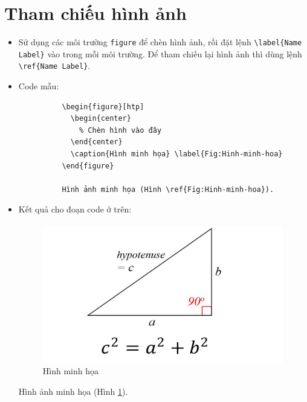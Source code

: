 \documentclass[12pt,a4paper]{article}
\begin{document}
  \section{Tham chiếu hình ảnh}
    \begin{itemize}
      \item Sử dụng các môi trường \verb|figure| để chèn hình ảnh, rồi đặt lệnh \verb|\label{Name Label}| vào trong mỗi môi trường. Để tham chiếu lại hình ảnh thì dùng lệnh \verb|\ref{Name Label}|.
      \item Code mẫu:
        \begin{verbatim}
          \begin{figure}[htp]
            \begin{center}
              % Chèn hình vào đây
            \end{center}
            \caption{Hình minh họa} \label{Fig:Hinh-minh-hoa}
          \end{figure}
    
          Hình ảnh minh họa (Hình \ref{Fig:Hinh-minh-hoa}).
        \end{verbatim}
      \item Kết quả cho đoạn code ở trên:
        
      \begin{figure}[!htp]
        \begin{center}
          \includegraphics[scale=0.5]{images/pytago}
        \end{center}
        \caption{Hình minh họa} \label{Fig:Hinh-minh-hoa}
      \end{figure}

      Hình ảnh minh họa (Hình \ref{Fig:Hinh-minh-hoa}).
    \end{itemize}
\end{document}
